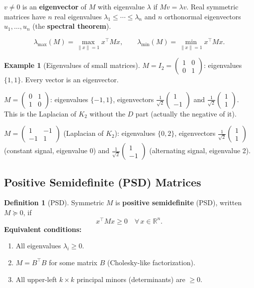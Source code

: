 \documentclass[12pt]{article}
\theoremstyle{definition}
\newtheorem{definition}[theorem]{Definition}
\newtheorem{example}[theorem]{Example}
\theoremstyle{remark}
\begin{document}
$v \ne 0$ is an \textbf{eigenvector} of $M$ with eigenvalue $\lambda$ if $Mv = \lambda v$.
Real symmetric matrices have $n$ real eigenvalues $\lambda_1 \le \cdots \le \lambda_n$
and $n$ orthonormal eigenvectors $u_1, \ldots, u_n$ (the \textbf{spectral theorem}).

\[
  \lambda_{\max}(M) = \max_{\|x\|=1} x^\top M x, \qquad
  \lambda_{\min}(M) = \min_{\|x\|=1} x^\top M x.
\]

\begin{example}[Eigenvalues of small matrices]
$M = I_2 = \begin{pmatrix}1&0\\0&1\end{pmatrix}$: eigenvalues $\{1,1\}$.
Every vector is an eigenvector.

$M = \begin{pmatrix}0&1\\1&0\end{pmatrix}$: eigenvalues $\{-1,1\}$,
eigenvectors $\frac{1}{\sqrt2}\begin{pmatrix}1\\-1\end{pmatrix}$ and
$\frac{1}{\sqrt2}\begin{pmatrix}1\\1\end{pmatrix}$.
This is the Laplacian of $K_2$ without the $D$ part (actually the negative of it).

$M = \begin{pmatrix}1&-1\\-1&1\end{pmatrix}$ (Laplacian of $K_2$):
eigenvalues $\{0, 2\}$, eigenvectors $\frac{1}{\sqrt2}\begin{pmatrix}1\\1\end{pmatrix}$
(constant signal, eigenvalue 0) and $\frac{1}{\sqrt2}\begin{pmatrix}1\\-1\end{pmatrix}$
(alternating signal, eigenvalue 2).
\end{example}

\subsection{Positive Semidefinite (PSD) Matrices}

\begin{definition}[PSD]
Symmetric $M$ is \textbf{positive semidefinite} (PSD), written $M \succeq 0$, if
\[
  x^\top M x \ge 0 \quad \forall\, x \in \mathbb{R}^n.
\]
\textbf{Equivalent conditions:}
\begin{enumerate}
  \item All eigenvalues $\lambda_i \ge 0$.
  \item $M = B^\top B$ for some matrix $B$ (Cholesky-like factorization).
  \item All upper-left $k \times k$ principal minors (determinants) are $\ge 0$.
\end{enumerate}
\end{definition}
\end{document}
